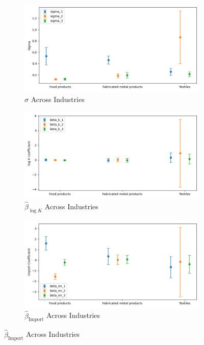 \documentclass{article}
\begin{document}
\begin{figure}[ht!]
    \begin{subfigure}[t]{0.32\textwidth}
        \centering
        \includegraphics[width=\textwidth]{figure/stationary_normal_kmshare_ciiu_sigma_across_industries_m3.png}
        \caption{$\hat\sigma$ Across Industries}
    \end{subfigure}
    \begin{subfigure}[t]{0.32\textwidth}
        \centering
        \includegraphics[width=\textwidth]{figure/stationary_normal_kmshare_ciiu_beta_k_across_industries_m3.png}
        \caption{$\hat{\beta}_{\log K}$ Across Industries}
    \end{subfigure}
    \begin{subfigure}[t]{0.32\textwidth}
        \centering
        \includegraphics[width=\textwidth]{figure/stationary_normal_kmshare_ciiu_beta_im_across_industries_m3.png}
        \caption{$\hat{\beta}_{\text{Import}}$ Across Industries}
    \end{subfigure}
\end{figure}
\end{document}
